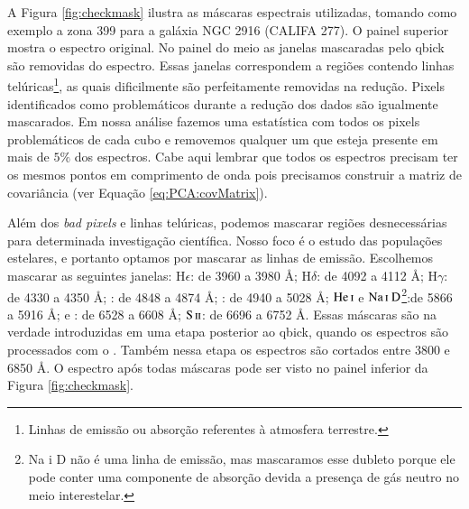 A Figura \ref{fig:checkmask} ilustra as máscaras espectrais utilizadas, tomando como exemplo a zona 399 para a galáxia
NGC 2916 (CALIFA 277). O painel superior mostra o espectro original. No painel do meio as janelas mascaradas pelo {\sc
qbick} são removidas do espectro. Essas janelas correspondem a regiões contendo linhas telúricas\footnote{Linhas de
emissão ou absorção referentes à atmosfera terrestre.}, as quais dificilmente são perfeitamente removidas na redução.
Pixels identificados como problemáticos durante a redução dos dados são igualmente mascarados. Em nossa análise fazemos
uma estatística com todos os pixels problemáticos de cada cubo e removemos qualquer um que esteja presente em mais de
$5\%$ dos espectros. Cabe aqui lembrar que todos os espectros precisam ter os mesmos pontos em comprimento de onda pois
precisamos construir a matriz de covariância (ver Equação \ref{eq:PCA:covMatrix}).
                                                                                                                                                                                                                                                                               
Além dos {\em bad pixels} e linhas telúricas, podemos mascarar regiões desnecessárias para determinada investigação
científica. Nosso foco é o estudo das populações estelares, e portanto optamos por mascarar as linhas de emissão.
Escolhemos mascarar as seguintes janelas: $\mathrm{H}\epsilon$: de 3960 a 3980 \AA; $\mathrm{H}\delta$: de 4092 a 4112
\AA; $\mathrm{H}\gamma$: de 4330 a 4350 \AA; \Hbeta: de 4848 a 4874 \AA; \oIII: de 4940 a 5028 \AA;
$\mathrm{He\,\textsc{i}}$ e $\mathrm{Na\,\textsc{i}\ D}$\footnote{Na {\sc i} D não é uma linha de emissão, mas
mascaramos esse dubleto porque ele pode conter uma componente de absorção devida a presença de gás neutro no meio
interestelar.}:de 5866 a 5916 \AA; \Halpha e \nII: de 6528 a 6608 \AA; $\mathrm{S\,\textsc{ii}}$: de 6696 a 6752 \AA.
Essas máscaras são na verdade introduzidas em uma etapa posterior ao {\sc qbick}, quando os espectros são processados
com o \starlight. Também nessa etapa os espectros são cortados entre 3800 e 6850 \AA. O espectro após todas máscaras
pode ser visto no painel inferior da Figura \ref{fig:checkmask}.

